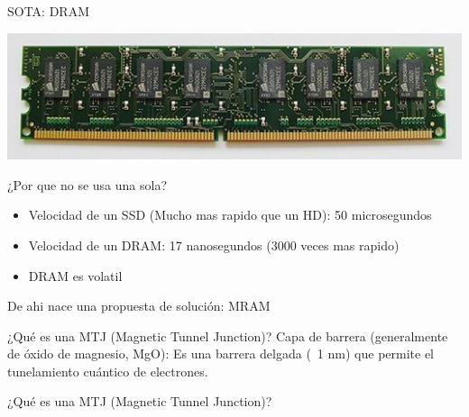 \documentclass[aspectratio=169]{beamer}
\begin{document}
\begin{frame}{SOTA: DRAM}
    \begin{center}
    \includegraphics[scale=.65]{fig/dram_1.jpeg}
    \end{center}
\end{frame}

\begin{frame}{¿Por que no se usa una sola?}
    \begin{itemize}
        \item Velocidad de un SSD (Mucho mas rapido que un HD): 50 microsegundos
        \item Velocidad de un DRAM: 17 nanosegundos (3000 veces mas rapido)
        \item DRAM es volatil
    \end{itemize}

    De ahi nace una propuesta de solución: MRAM
\end{frame}

\begin{frame}{¿Qué es una MTJ (Magnetic Tunnel Junction)?}
Capa de barrera (generalmente de óxido de magnesio, MgO): Es una barrera delgada (~1 nm) que permite el tunelamiento cuántico de electrones.
\end{frame}

\begin{frame}{¿Qué es una MTJ (Magnetic Tunnel Junction)?}
\begin{columns}[c] 


\end{columns}
\end{frame}
\end{document}
